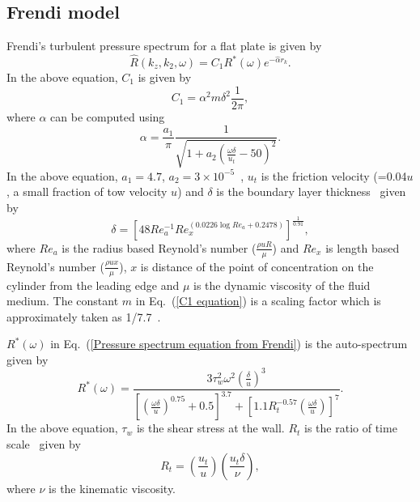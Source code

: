 \documentclass[twocolumn,10pt]{asme2ej}
\begin{document}
\subsection{Frendi model}
\label{Frendi model}
Frendi's turbulent pressure spectrum for a flat plate is given by 
\begin{equation}\label{Pressure spectrum equation from Frendi}
    \hat{R}(k_{z},k_{2},\omega) = C_{1}R^{*}(\omega)e^{-\hat{\alpha}r_{k}}.
\end{equation}
In the above equation, $C_{1}$ is given by
\begin{equation}\label{C1 equation}
C_{1} = \alpha^{2}m\delta^{2}\frac{1}{2\pi},   
\end{equation}
where $\alpha$ can be computed using
\begin{equation}\label{alpha equation}
   \alpha = \frac{a_1}{\pi}\frac{1}{\sqrt{1+a_2(\frac{\omega \delta}{u_{t}}-50)^{2}}}.
\end{equation}
In the above equation, $a_1=4.7$, $a_2=3\times10^{-5}$~\cite{frendi2020}, $u_{t}$ is the friction velocity (=0.04$u$, a small fraction of tow velocity $u$) and $\delta$ is the boundary layer thickness~\cite{Jordan2014} given by
\begin{equation}\label{boundary layer thickness}
    \delta = [48Re_a^{-1}Re_x^{(0.0226\log{Re_a}+0.2478)}]^{\frac{1}{0.91}},
\end{equation}
where $Re_a$ is the radius based Reynold's number ($\frac{\rho u R}{\mu}$) and $Re_x$ is length based Reynold's number ($\frac{\rho u x}{\mu}$), $x$ is distance of the point of concentration on the cylinder from the leading edge and $\mu$ is the dynamic viscosity of the fluid medium. The constant $m$ in Eq.~(\ref{C1 equation}) is a scaling factor which is approximately taken as 1/7.7~\cite{frendi2020}. 

$R^{*}(\omega)$ in Eq.~(\ref{Pressure spectrum equation from Frendi}) is the auto-spectrum given by~\cite{goody2004}
\begin{equation}\label{Auto spectrum equation from Goody}
    R^{*}(\omega) = \frac{3\tau_{w}^{2}\omega^{2}(\frac{\delta}{u})^{3}}{[(\frac{\omega \delta}{u})^{0.75} + 0.5]^{3.7} + [1.1R_{t}^{-0.57}(\frac{\omega \delta}{u})]^{7}}.
\end{equation}
In the above equation, $\tau_{w}$ is the shear stress at the wall. $R_{t}$ is the ratio of time scale~\cite{goody2004} given by
\begin{equation}\label{Time scale equation from Goody}
    R_{t} = \left (\frac{u_{t}}{u}\right)\left(\frac{u_{t}\delta}{\nu}\right),
\end{equation}
where $\nu$ is the kinematic viscosity. 
\end{document}
